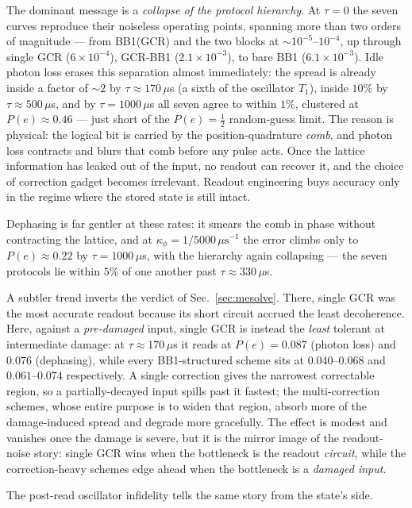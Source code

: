 The dominant message is a \emph{collapse of the protocol hierarchy}. At $\tau=0$ the seven
curves reproduce their noiseless operating points, spanning more than two orders of
magnitude --- from BB1(GCR) and the two blocks at $\sim\!10^{-5}$--$10^{-4}$, up through single
GCR ($6\times10^{-4}$), GCR-BB1 ($2.1\times10^{-3}$), to bare BB1 ($6.1\times10^{-3}$). Idle
photon loss erases this separation almost immediately: the spread is already inside a factor of
$\sim\!2$ by $\tau\approx170\,\mu$s (a sixth of the oscillator $T_1$), inside $10\%$ by
$\tau\approx500\,\mu$s, and by $\tau=1000\,\mu$s all seven agree to within $1\%$, clustered at
$P(e)\approx0.46$ --- just short of the $P(e)=\tfrac12$ random-guess limit. The reason is
physical: the logical bit is carried by the position-quadrature \emph{comb}, and photon loss
contracts and blurs that comb before any pulse acts. Once the lattice information has leaked out
of the input, no readout can recover it, and the choice of correction gadget becomes
irrelevant. Readout engineering buys accuracy only in the regime where the stored state is
still intact.

Dephasing is far gentler at these rates: it smears the comb in phase without contracting the
lattice, and at $\kappa_\phi=1/5000\,\mu\mathrm{s}^{-1}$ the error climbs only to
$P(e)\approx0.22$ by $\tau=1000\,\mu$s, with the hierarchy again collapsing --- the seven
protocols lie within $5\%$ of one another past $\tau\approx330\,\mu$s.

A subtler trend inverts the verdict of Sec.~\ref{sec:mesolve}. There, single GCR was the most
accurate readout because its short circuit accrued the least decoherence. Here, against a
\emph{pre-damaged} input, single GCR is instead the \emph{least} tolerant at intermediate
damage: at $\tau\approx170\,\mu$s it reads at $P(e)=0.087$ (photon loss) and $0.076$
(dephasing), while every BB1-structured scheme sits at $0.040$--$0.068$ and $0.061$--$0.074$
respectively. A single correction gives the narrowest correctable region, so a partially-decayed
input spills past it fastest; the multi-correction schemes, whose entire purpose is to widen
that region, absorb more of the damage-induced spread and degrade more gracefully. The effect
is modest and vanishes once the damage is severe, but it is the mirror image of the
readout-noise story: single GCR wins when the bottleneck is the readout \emph{circuit}, while
the correction-heavy schemes edge ahead when the bottleneck is a \emph{damaged input}.

The post-read oscillator infidelity tells the same story from the state's side.

